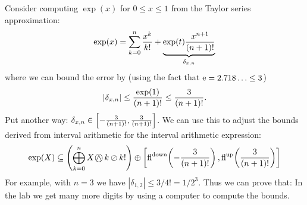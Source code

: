 \begin{example} Consider computing $\exp(x)$ for $0 \ensuremath{\leq} x \ensuremath{\leq} 1$ from the Taylor series approximation:
\[
\exp(x) = \sum_{k=0}^n {x^k \over k!} + \underbrace{\exp(t){x^{n+1} \over (n+1)!}}_{\ensuremath{\delta}_{x,n}}
\]
where we can bound the error by (using the fact that ${\rm e} = 2.718\ldots \leq 3$)
\[
|\ensuremath{\delta}_{x,n}| \ensuremath{\leq} {\exp(1) \over (n+1)!} \ensuremath{\leq} {3 \over (n+1)!}.
\]
Put another way: $\ensuremath{\delta}_{x,n} \ensuremath{\in} \left[-{3 \over (n+1)!}, {3 \over (n+1)!}\right]$. We can use this to adjust the bounds derived from interval arithmetic for the interval arithmetic expression:
\[
\exp(X) \ensuremath{\subseteq} \left(\ensuremath{\bigoplus}_{k=0}^n {X \ocaret k \ensuremath{\oslash} k!}\right) \ensuremath{\oplus} \left[\fldown\fpr(-{3 \over (n+1)!}), \flup\fpr({3 \over (n+1)!})\right]
\]
For example, with $n = 3$ we have $|\ensuremath{\delta}_{1,2}| \ensuremath{\leq} 3/4! = 1/2^3$. Thus we can prove that:
In the lab we get many more digits by using a computer to compute the bounds. \end{example}




